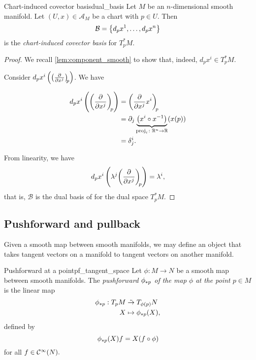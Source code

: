 \begin{theorem}{Chart-induced covector basis}{dual_basis}
    Let \(M\) be an \(n\)-dimensional smooth manifold. Let \((U, x) \in \mathscr{A}_M\) be a chart with \(p \in U\). Then
    \begin{equation*}
        \mathcal{B} = \set*{d_p x^1, \dots, d_p x^n}
    \end{equation*}
    is the \emph{chart-induced covector basis} for \(T_p ^{\ast} M\).
\end{theorem}
\begin{proof}
    We recall \cref{lem:component_smooth} to show that, indeed, \(d_p x^i \in T_p ^{\ast} M\).

    Consider \(d_p x^i \left(\bvec{x^j}{p}\right)\). We have

    \begin{align*}
        d_p x^i \left(\bvec{x^j}{p}\right) &= \bvec[x^i]{x^j}{p}\\
                                           &= \partial_j \underbrace{\left(x^i \circ x^{-1}\right)}_{\mathrm{proj}_i \colon \mathbb{R}^n \to \mathbb{R}}(x(p))\\
                                           &= \delta_j^i.
    \end{align*}

    From linearity, we have
    \begin{equation*}
        d_px^i\left(\lambda^j \bvec{x^j}{p}\right) = \lambda^i,
    \end{equation*}
    that is, \(\mathcal{B}\) is the dual basis of  for the dual space \(T_p ^{\ast}M\).
\end{proof}

\subsection{Pushforward and pullback}

Given a smooth map between smooth manifolds, we may define an object that takes tangent vectors on a manifold to tangent vectors on another manifold.

\begin{definition}{Pushforward at a point}{pf_tangent_space}
    Let \(\phi : M \to N\) be a smooth map between smooth manifolds. The \emph{pushforward \(\pf[p]\phi\) of the map \(\phi\) at the point \(p \in M\)} is the linear map
    \begin{align*}
        \pf[p]\phi : T_pM &\linear T_{\phi(p)}N\\
                        X &\mapsto \pf[p]\phi(X),
    \end{align*}
    defined by
    \begin{equation*}
        \pf[p]{\phi}(X)f = X(f \circ \phi)
    \end{equation*}
    for all \(f \in \smooth{N}.\)
\end{definition}

